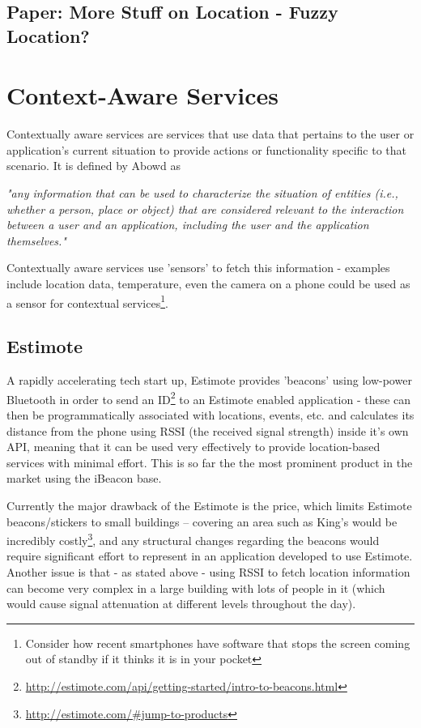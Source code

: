 \documentclass[11pt]{informatics-report}
\begin{document}
\subsection{Paper: More Stuff on Location - Fuzzy Location?} 

\section{Context-Aware Services}

Contextually aware services are services that use data that pertains to the user or application's current situation to provide actions or functionality specific to that scenario. It is defined by Abowd as 

\textit{ "any information that can be used to characterize the situation of entities (i.e., whether a person, place or object) that are considered relevant to the interaction between a user and an application, including the user and the application themselves." }\cite{abowd1999towards}

Contextually aware services use 'sensors' to fetch this information - examples include location data, temperature, even the camera on a phone could be used as a sensor for contextual services\footnote{Consider how recent smartphones have software that stops the screen coming out of standby if it thinks it is in your pocket}.

\subsection{Estimote}

A rapidly accelerating tech start up, Estimote provides 'beacons' using low-power Bluetooth in order to send an ID\footnote{\url{http://estimote.com/api/getting-started/intro-to-beacons.html}} to an Estimote enabled application - these can then be programmatically associated with locations, events, etc. and calculates its distance from the phone using RSSI (the received signal strength) inside it's own API, meaning that it can be used very effectively to provide location-based services with minimal effort. This is so far the the most prominent product in the market using the iBeacon base.

Currently the major drawback of the Estimote is the price, which limits Estimote beacons/stickers to small buildings – covering an area such as King’s would be incredibly costly\footnote{\url{http://estimote.com/\#jump-to-products}}, and any structural changes regarding the beacons would require significant effort to represent in an application developed to use Estimote. Another issue is that - as stated above - using RSSI to fetch location information can become very complex in a large building with lots of people in it (which would cause signal attenuation at different levels throughout the day). 
\end{document}
